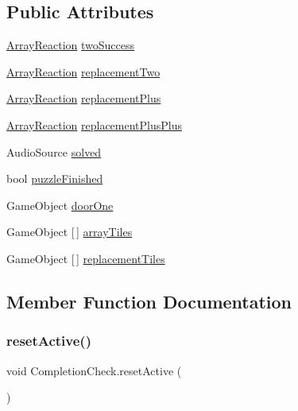\subsection*{Public Attributes}
\begin{DoxyCompactItemize}
\item 
\hyperlink{class_array_reaction}{Array\+Reaction} \hyperlink{class_completion_check_a565266c6464718da6c52d813c3b0ff32}{two\+Success}
\item 
\hyperlink{class_array_reaction}{Array\+Reaction} \hyperlink{class_completion_check_ab2384403c14606be2c726ba3fb4278f2}{replacement\+Two}
\item 
\hyperlink{class_array_reaction}{Array\+Reaction} \hyperlink{class_completion_check_ac92b5dad9a4e4aee625e20fce2fb4d0f}{replacement\+Plus}
\item 
\hyperlink{class_array_reaction}{Array\+Reaction} \hyperlink{class_completion_check_a90ecb0589046ab6ecc5a00bec9c266c0}{replacement\+Plus\+Plus}
\item 
Audio\+Source \hyperlink{class_completion_check_ab3aee64fe90f53bb4cff27b659072472}{solved}
\item 
bool \hyperlink{class_completion_check_a1b78317104756d1316af22e2bb555e4a}{puzzle\+Finished}
\item 
Game\+Object \hyperlink{class_completion_check_ae9a5f29e14ffbe992a16f08ebc2dc9f4}{door\+One}
\item 
Game\+Object \mbox{[}$\,$\mbox{]} \hyperlink{class_completion_check_ad53ac3b7c0d769b85b53bdb222172b7d}{array\+Tiles}
\item 
Game\+Object \mbox{[}$\,$\mbox{]} \hyperlink{class_completion_check_a2a5b3a10802d72c018ddc7f1d41ae60c}{replacement\+Tiles}
\end{DoxyCompactItemize}


\subsection{Member Function Documentation}
\mbox{\label{class_completion_check_a54ea0b1dfecf4892ff9f43b0399c4dda}} 
\subsubsection{\texorpdfstring{reset\+Active()}{resetActive()}}
{\footnotesize\ttfamily void Completion\+Check.\+reset\+Active (\begin{DoxyParamCaption}{ }\end{DoxyParamCaption})}

